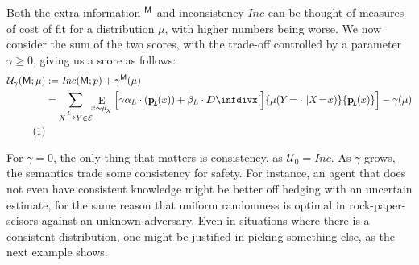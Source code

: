 \documentclass{article}
\theoremstyle{plain}
\theoremstyle{definition}
\theoremstyle{remark}
\newcommand{\thickD}{I\mkern-8muD}
\newcommand{\kldiv}{\thickD\infdivx}%
\let\H\relax
\DeclareMathOperator{\H}{\mathrm{H}} %
\DeclareMathOperator{\E}{\mathrm{E}} %
\newcommand\mat[1]{\mathbf{#1}}
\newcommand\numberthis{\addtocounter{equation}{1}\tag{\theequation}}
\def\sheq{\!=\!}
\newcommand{\bp}[1][L]{\mat{p}_{\!_{#1}\!}}
\newcommand{\Ed}{\mathcal E}
\newcommand{\sfM}{\mathsf M}
\newcommand\inconsist{\mathit{Inc}}
\numberwithin{equation}{section}
\begin{document}
	Both the extra information $\H^\sfM$ and inconsistency
        $\inconsist$ can be thought of measures of cost of fit for a
        distribution $\mu$, with higher numbers being worse.
%	
	We now consider the sum of the two scores, with the trade-off
        controlled by a parameter $\gamma \ge 0$, giving us a score as
        follows:  
	\begin{align*}
		\mathcal U_{\gamma}(\sfM; \mu) &:= \inconsist(\sfM;p) + \gamma \H^\sfM(\mu)\\
		&= \sum_{ X \xrightarrow{\!\!L} Y  \in \Ed } \!\! \E_{x \sim \mu_{\!_X}}  \left[\gamma\alpha_L\cdot \H (\bp (x)) + \beta_L \cdot \kldiv[\Big]{ \mu(Y\!= \cdot\ | X \sheq x) }{\bp(x) }  \right]  - \gamma \H(\mu) \\
			\numberthis\label{eqn:full-score}
	\end{align*}
	
	For $\gamma = 0$, the only thing that matters is consistency, as $\mathcal U_0 = \inconsist$.
	As $\gamma$ grows, the semantics trade some consistency for
        safety. For instance, an agent that does not even have
        consistent knowledge might be better off hedging with an
        uncertain estimate, for the same reason that uniform
        randomness is optimal in rock-paper-scisors against an unknown
        adversary. Even in situations where there is a consistent
        distribution, one might be justified in picking something
        else, as the next example shows.  
	
\end{document}
